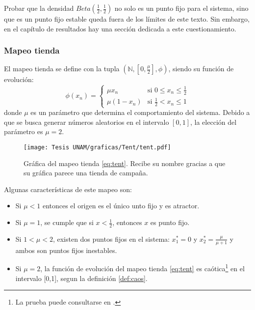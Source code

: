 \documentclass[../Main.tex]{subfiles}
\begin{document}
Probar que la densidad $Beta\left(\frac{1}{2},\frac{1}{2}\right)$ no solo es un punto fijo para el sistema, sino que es un punto fijo estable queda fuera de los límites de este texto. Sin embargo, en el capítulo de resultados hay una sección dedicada a este cuestionamiento.  



\subsubsection{Mapeo tienda}
El mapeo tienda se define con la tupla $(\mathbb{N},[0,\frac{\mu}{2}],\phi)$, siendo su función de evolución:
\begin{equation}
    \label{eq:tent}
\phi(x_{n}) = 
\begin{cases} 
\mu x_n & \text{si } 0 \le x_n \le \frac{1}{2} \\
\mu (1 - x_n) & \text{si } \frac{1}{2} < x_n \le 1 
\end{cases}
\end{equation}
donde $\mu$ es un parámetro que determina el comportamiento del sistema. Debido a que se busca generar números aleatorios en el intervalo $[0,1]$, la elección del parámetro es $\mu=2$.
\begin{figure}[h]
    \centering
    \texttt{[image: Tesis UNAM/graficas/Tent/tent.pdf]}
    \caption{Gráfica del mapeo tienda \ref{eq:tent}. Recibe su nombre gracias a que su gráfica parece una tienda de campaña.}
    \label{fig:tent_proof}
\end{figure} 

Algunas características de este mapeo son:

\begin{itemize}
    \item Si $\mu<1$ entonces el origen es el único unto fijo y es atractor.
    \item Si $\mu=1$, se cumple que si $x<\frac{1}{2}$, entonces $x$ es punto fijo.
    \item Si $1<\mu<2$, existen dos puntos fijos en el sistema: $x^*_1=0$ y $x^*_2=\frac{\mu}{\mu +1}$ y ambos son puntos fijos inestables.
    \item Si $\mu=2$, la función de evolución del mapeo tienda \ref{eq:tent} es caótica\footnote{La prueba puede consultarse en \cite{KingMendez2014}.} en el intervalo [0,1], segun la definición \ref{def:caos}.
\end{itemize}
\end{document}

